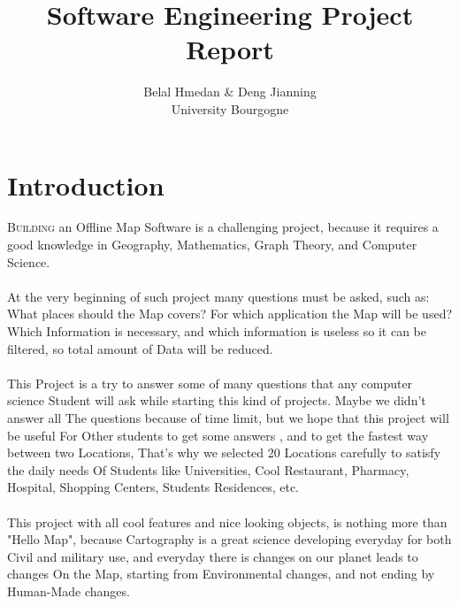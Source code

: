 \documentclass[a4paper,english]{book}
\title{\textbf{Software Engineering Project Report}}
\begin{document}
\author{Belal Hmedan \& Deng Jianning\\University Bourgogne}
\maketitle
\let\cleardoublepage\clearpage
\tableofcontents
\chapter*{Introduction}
 
\lettrine{B}{uilding} an Offline Map Software is a challenging project, 
because it requires a good knowledge in Geography, Mathematics, 
Graph Theory, and Computer Science.\\\\

At the very beginning of such project many questions must be asked, such as: 
What places should the Map covers? For which application the Map will be used?
Which Information is necessary, and which information is useless so it can be 
filtered, so total amount of Data will be reduced.\\\\

This Project is a try to answer some of many questions that any computer 
science Student will ask while starting this kind of projects. Maybe we 
didn't answer all The questions because of time limit, but we hope that 
this project will be useful For Other students to get some answers , and 
to get the fastest way between two Locations, That's why we selected 20 
Locations carefully to satisfy the daily needs Of Students like Universities, 
Cool Restaurant, Pharmacy, Hospital, Shopping Centers, Students Residences, etc.\\\\

This project with all cool features and nice looking objects, is nothing more 
than "Hello Map", because Cartography is a great science developing everyday 
for both Civil and military use, and everyday there is changes on our planet 
leads to changes On the Map, starting from Environmental changes, and not ending 
by Human-Made changes. 
\end{document}

